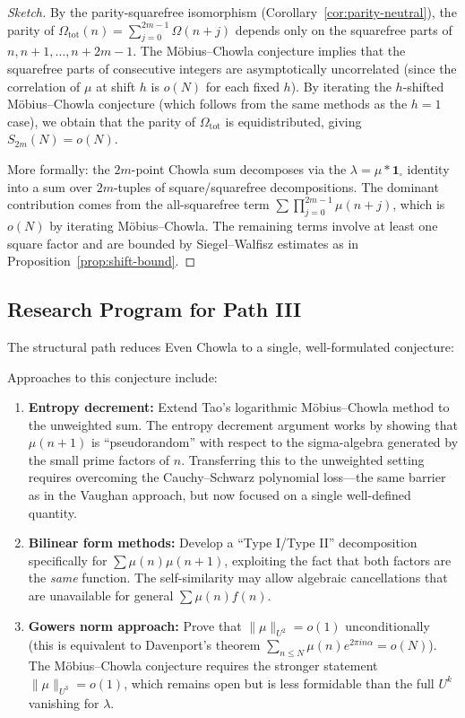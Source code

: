 \documentclass[11pt,a4paper]{article}
\theoremstyle{definition}
\begin{document}
\begin{proof}[Sketch]
By the parity-squarefree isomorphism (Corollary~\ref{cor:parity-neutral}), the parity of $\Omega_{\mathrm{tot}}(n) = \sum_{j=0}^{2m-1} \Omega(n+j)$ depends only on the squarefree parts of $n, n+1, \ldots, n+2m-1$. The M\"obius--Chowla conjecture implies that the squarefree parts of consecutive integers are asymptotically uncorrelated (since the correlation of $\mu$ at shift $h$ is $o(N)$ for each fixed $h$). By iterating the $h$-shifted M\"obius--Chowla conjecture (which follows from the same methods as the $h=1$ case), we obtain that the parity of $\Omega_{\mathrm{tot}}$ is equidistributed, giving $S_{2m}(N) = o(N)$.

More formally: the $2m$-point Chowla sum decomposes via the $\lambda = \mu * \mathbf{1}_\square$ identity into a sum over $2m$-tuples of square/squarefree decompositions. The dominant contribution comes from the all-squarefree term $\sum \prod_{j=0}^{2m-1} \mu(n+j)$, which is $o(N)$ by iterating M\"obius--Chowla. The remaining terms involve at least one square factor and are bounded by Siegel--Walfisz estimates as in Proposition~\ref{prop:shift-bound}.
\end{proof}

\subsection{Research Program for Path III}

The structural path reduces Even Chowla to a single, well-formulated conjecture:

\begin{center}
\end{center}

Approaches to this conjecture include:
\begin{enumerate}
\item \textbf{Entropy decrement:} Extend Tao's logarithmic M\"obius--Chowla method to the unweighted sum. The entropy decrement argument works by showing that $\mu(n+1)$ is ``pseudorandom'' with respect to the sigma-algebra generated by the small prime factors of $n$. Transferring this to the unweighted setting requires overcoming the Cauchy--Schwarz polynomial loss---the same barrier as in the Vaughan approach, but now focused on a single well-defined quantity.

\item \textbf{Bilinear form methods:} Develop a ``Type I/Type II'' decomposition specifically for $\sum \mu(n)\mu(n+1)$, exploiting the fact that both factors are the \emph{same} function. The self-similarity may allow algebraic cancellations that are unavailable for general $\sum \mu(n) f(n)$.

\item \textbf{Gowers norm approach:} Prove that $\|\mu\|_{U^2} = o(1)$ unconditionally (this is equivalent to Davenport's theorem $\sum_{n \le N} \mu(n) e^{2\pi i n \alpha} = o(N)$). The M\"obius--Chowla conjecture requires the stronger statement $\|\mu\|_{U^3} = o(1)$, which remains open but is less formidable than the full $U^k$ vanishing for $\lambda$.
\end{enumerate}
\end{document}
